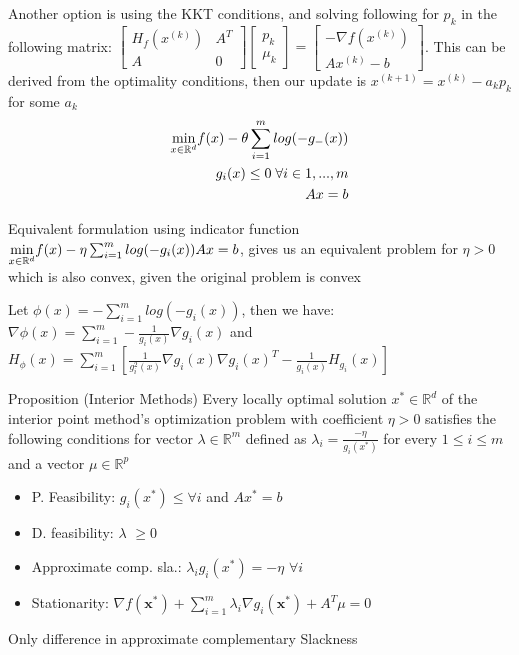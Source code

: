 \documentclass[a4paper]{article}
\begin{document}
Another option is using the KKT conditions, and solving following for $p_k$ in the following matrix:
$\left[\begin{smallmatrix} H_f(x^{(k)}) & A^T \\ A & 0 \end{smallmatrix}\right] \left[\begin{smallmatrix} p_k \\ \mu_k \end{smallmatrix}\right] = \left[\begin{smallmatrix} -\nabla f(x^{(k)}) \\ Ax^{(k)} - b \end{smallmatrix}\right]  $. This can be derived from the optimality conditions, then our update is $x^{(k+1)} = x^{(k)} - a_k p_k$ for some $a_k$ 
\begin{align}\vspace{-0.5cm}
    \underset{x\in \mathbb{R}^d}{\min} f(x) - \theta \sum_{i=1}^{m} log(-g_-(x))\\
    g_i(x) \leq 0 \; \forall i \in 
    {1, ..., m}\\
    Ax = b
\end{align} 
\begin{subbox}{Equivalent formulation using indicator function}
    $\underset{x\in \mathbb{R}^d}{\min} f(x) - \eta \sum_{i=1}^{m} log(-g_i(x))\\
    Ax = b$, gives us an equivalent problem for $\eta >0$ which is also convex, given the original problem is convex 
\end{subbox}
Let $\phi(x) = - \sum_{i=1}^{m} log(-g_i(x))$, then we have:\\
 $\nabla \phi(x) = \sum_{i=1}^{m} -\frac{1}{g_i(x)} \nabla g_i(x)$ and \\
 $H_\phi(x) = \sum_{i=1}^{m} \left[ \frac{1}{g_i^2(x)}\nabla g_i(x) \nabla g_i(x)^T - \frac{1}{g_i(x)}H_{g_i}(x)\right]$   


\begin{mainbox}{Proposition (Interior Methods)}
    Every locally optimal solution $x^* \in \mathbb{R}^d$ of the interior point method's optimization problem with coefficient $\eta > 0$ satisfies the following conditions for vector $\lambda \in \mathbb{R}^m$ defined as $\lambda_i = \frac{-\eta}{g_i(x^*)}$ for every $1 \leq i \leq m$ and a vector $\mu \in \mathbb{R}^p$
    \begin{itemize}
    \item P. Feasibility: $g_i(x^*) \leq \forall i$ and $Ax^* = b$
    \item D. feasibility: \textbf{$\lambda$} $\geq 0$
    \item Approximate comp. sla.: $\lambda_ig_i(x^*) = -\eta$ $\forall i$
    \item Stationarity: $\nabla f(\textbf{x}^*) + \sum_{i=1}^{m} \lambda_i \nabla g_i(\textbf{x}^*) + A^T $\textbf{$\mu$}$ = 0$     
    \end{itemize}      
    
    Only difference in approximate complementary Slackness
    
\end{mainbox}  
\end{document}
